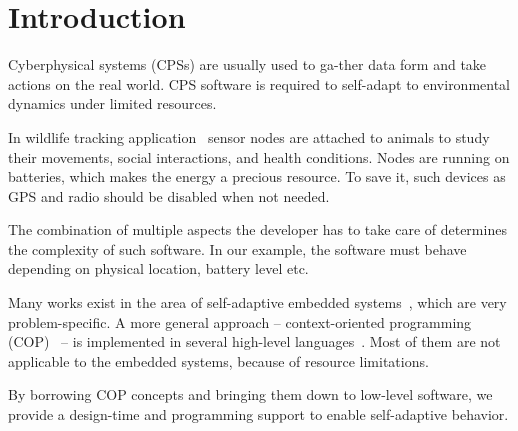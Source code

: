 \section{Introduction}

Cyberphysical systems (CPSs) are usually used to ga-ther data form and take
actions on the real world. CPS software is required to self-adapt to
environmental dynamics under limited resources.

In wildlife tracking application~\cite{pasztor10:selective} sensor nodes are
attached to animals to study their movements, social interactions, and health
conditions. Nodes are running on batteries, which makes the energy a precious
resource. To save it, such devices as GPS and radio should be disabled when not
needed.

The combination of multiple aspects the developer has to take care of determines
the complexity of such software. In our example, the software must behave
depending on physical location, battery level etc.

Many works exist in the area of self-adaptive embedded
systems~\cite{Zimmerling12,Bourdenas11}, which are very problem-specific. A more
general approach -- context-oriented programming (COP)~\cite{Hirschfeld08} -- is
implemented in several high-level
languages~\cite{Ghezzi10,Salvaneschi12,Sehic11}. Most of them are not applicable
to the embedded systems, because of resource limitations.

By borrowing COP concepts and bringing them down to low-level software, we
provide a design-time and programming support to enable self-adaptive
behavior.
